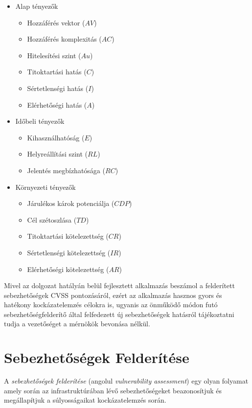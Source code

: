 \documentclass[a4paper,12pt]{article}
\begin{document}
	\begin{multicols}{2}
		\begin{itemize}
			\item Alap tényezők
				\begin{itemize}
					\item Hozzáférés vektor ($AV$)
					\item Hozzáférés komplexitás ($AC$)
					\item Hitelesítési szint ($Au$)
					\item Titoktartási hatás ($C$)
					\item Sértetlenségi hatás ($I$)
					\item Elérhetőségi hatás ($A$)
				\end{itemize}
			\item Időbeli tényezők
				\begin{itemize}
					\item Kihasználhatóság ($E$)
					\item Helyreállítási szint ($RL$)
					\item Jelentés megbízhatósága ($RC$)
				\end{itemize}
			\item Környezeti tényezők
				\begin{itemize}
					\item Járulékos károk potenciálja ($CDP$)
					\item Cél szétoszlása ($TD$)
					\item Titoktartási kötelezettség ($CR$)
					\item Sértetlenségi kötelezettség ($IR$)
					\item Elérhetőségi kötelezettség ($AR$)
				\end{itemize}
		\end{itemize}
	\end{multicols}
	
	Mivel az dolgozat hatályán belül fejlesztett alkalmazás beszámol a felderített sebezhetőségek CVSS pontozásáról, ezért az alkalmazás hasznos gyors és hatékony kockázatelemzés célokra is, ugyanis az önműködő módon futó sebezhetőségfelderítő által felfedezett új sebezhetőségek hatásról tájékoztatni tudja a vezetőséget a mérnökök bevonása nélkül.
	
\section{Sebezhetőségek Felderítése}
	
	A \textit{sebezhetőségek felderítése} (angolul \textit{vulnerability assessment}) egy olyan folyamat amely során az infrastruktúrában lévő sebezhetőségeket beazonosítjuk és megállapítjuk a súlyosságaikat kockázatelemzés során.
	
\end{document}
